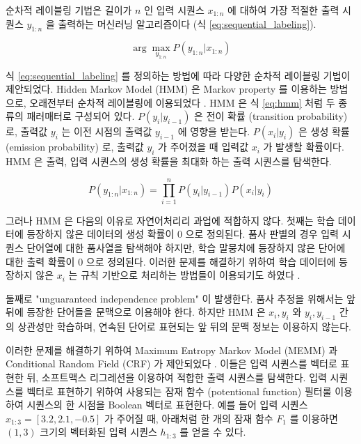 \documentclass[oneside, ko,phd]{snuthesis_utf8_kor}
\begin{document}
순차적 레이블링 기법은 길이가 $n$ 인 입력 시퀀스 $x_{1:n}$ 에 대하여 가장 적절한 출력 시퀀스 $y_{1:n}$ 을 출력하는 머신러닝 알고리즘이다 (식 \ref{eq:sequential_labeling}).

\begin{equation}
  \label{eq:sequential_labeling}
  \arg \max_{y_{1:n}} P(y_{1:n} \vert x_{1:n})
\end{equation}

식 \ref{eq:sequential_labeling} 를 정의하는 방법에 따라 다양한 순차적 레이블링 기법이 제안되었다.
Hidden Markov Model (HMM) 은 Markov property 를 이용하는 방법으로, 오래전부터 순차적 레이블링에 이용되었다 \cite{krogh1994hidden}.
HMM 은 식 \ref{eq:hmm} 처럼 두 종류의 패러매터로 구성되어 있다.
$P(y_i \vert y_{i-1})$ 은 전이 확률 (transition probability) 로, 출력값 $y_i$ 는 이전 시점의 출력값 $y_{i-1}$ 에 영향을 받는다.
$P(x_i \vert y_i)$ 은 생성 확률 (emission probability) 로, 출력값 $y_i$ 가 주어졌을 때 입력값 $x_i$ 가 발생할 확률이다.
HMM 은 출력, 입력 시퀀스의 생성 확률을 최대화 하는 출력 시퀀스를 탐색한다.

\begin{equation}
  \label{eq:hmm}
  P(y_{1:n} \vert x_{1:n}) = \prod_{i=1}^{n} P(y_i \vert y_{i-1}) P(x_i \vert y_i)
\end{equation}

그러나 HMM 은 다음의 이유로 자연어처리리 과업에 적합하지 않다.
첫째는 학습 데이터에 등장하지 않은 데이터의 생성 확률이 0 으로 정의된다.
품사 판별의 경우 입력 시퀀스 단어열에 대한 품사열을 탐색해야 하지만, 학습 말뭉치에 등장하지 않은 단어에 대한 출력 확률이 0 으로 정의된다.
이러한 문제를 해결하기 위하여 학습 데이터에 등장하지 않은 $x_i$ 는 규칙 기반으로 처리하는 방법들이 이용되기도 하였다 \cite{brants2000tnt}.

둘째로 "unguaranteed independence problem" 이 발생한다.
품사 추정을 위해서는 앞 뒤에 등장한 단어들을 문맥으로 이용해야 한다.
하지만 HMM 은 $x_i, y_i$ 와 $y_i, y_{i-1}$ 간의 상관성만 학습하며, 연속된 단어로 표현되는 앞 뒤의 문맥 정보는 이용하지 않는다.

이러한 문제를 해결하기 위하여 Maximum Entropy Markov Model (MEMM) 과 Conditional Random Field (CRF) 가 제안되었다 \cite{mccallum2000maximum, lafferty2001conditional}.
이들은 입력 시퀀스를 벡터로 표현한 뒤, 소프트맥스 리그레션을 이용하여 적합한 출력 시퀀스를 탐색한다.
입력 시퀀스를 벡터로 표현하기 위하여 사용되는 잠재 함수 (potentional function) 필터룰 이용하여 시퀀스의 한 시점을 Boolean 벡터로 표현한다.
예를 들어 입력 시퀀스 $x_{1:3}=[3.2, 2.1, -0.5]$ 가 주어질 때, 아래처럼 한 개의 잠재 함수 $F_1$ 를 이용하면 $(1, 3)$ 크기의 벡터화된 입력 시퀀스 $h_{1:3}$ 를 얻을 수 있다.
\end{document}
